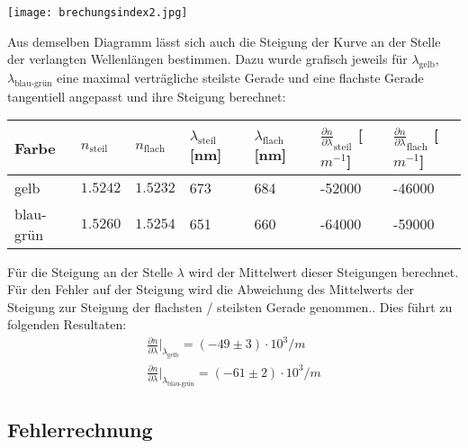 \documentclass[12pt,a4paper]{article} %
\begin{document}
\newpage
\begin{center} \texttt{[image: brechungsindex2.jpg]} \end{center}

Aus demselben Diagramm lässt sich auch die Steigung der Kurve an der Stelle der verlangten Wellenlängen bestimmen. Dazu wurde grafisch jeweils für $\lambda_{\text{gelb}}$, $\lambda_{\text{blau-grün}}$ eine maximal verträgliche steilste Gerade und eine flachste Gerade tangentiell angepasst und ihre Steigung berechnet:

\begin{table}[h] \begin{center}
		\begin{tabular}{|l|llll|ll|}\hline
			Farbe & $n_{\text{steil}}$ & $n_{\text{flach}}$ & $\lambda_{\text{steil}}$ [nm] & $\lambda_{\text{flach}}$ [nm] & $\frac{\partial n}{\partial\lambda}_{\text{steil}}$ [$m^{-1}$] & $\frac{\partial n}{\partial\lambda}_{\text{flach}}$ [$m^{-1}$] \\ \hline
			gelb & $1.5242$ & $1.5232$ & 673 & 684 & -52000 & -46000 \\
			blau-grün & $1.5260$ & $1.5254$ & 651 & 660 & -64000 & -59000 \\ \hline
	\end{tabular} \end{center}
\end{table}

Für die Steigung an der Stelle $\lambda$ wird der Mittelwert dieser Steigungen berechnet. Für den Fehler auf der Steigung wird die Abweichung des Mittelwerts der Steigung zur Steigung der flachsten / steilsten Gerade genommen.. Dies führt zu folgenden Resultaten:
\begin{align}
\frac{\partial n}{\partial \lambda}\bigg\vert_{\lambda_{\text{gelb}}} = (-49 \pm 3)\cdot 10^3 /m\\
\frac{\partial n}{\partial \lambda}\bigg\vert_{\lambda_{\text{blau-grün}}} = (-61 \pm 2)\cdot 10^3/m
\end{align}


\newpage
\subsection{Fehlerrechnung}




\end{document}
